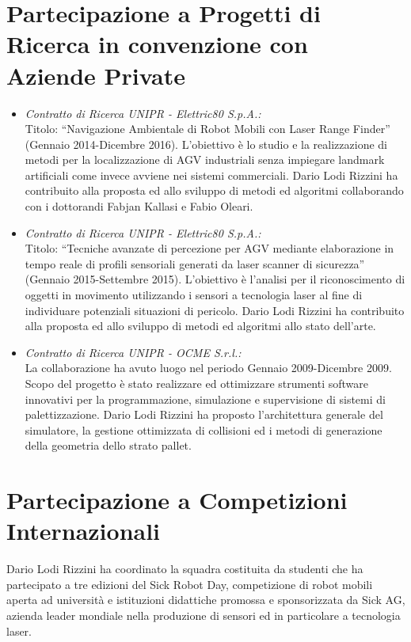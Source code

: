 \documentclass[11pt]{article}
\newcommand{\ITEMDATE}[1]{\item \textit{#1:}\\}
\begin{document}
\section*{Partecipazione a Progetti di Ricerca in convenzione con Aziende Private}

\begin{itemize}

\ITEMDATE{Contratto di Ricerca UNIPR - Elettric80 S.p.A.} 
Titolo: ``Navigazione Ambientale di Robot Mobili con Laser Range Finder'' (Gennaio 2014-Dicembre 2016). 
L'obiettivo \`e lo studio e la realizzazione di metodi per la localizzazione di AGV industriali 
senza impiegare landmark artificiali come invece avviene nei sistemi commerciali.
Dario Lodi Rizzini ha contribuito alla proposta ed allo sviluppo di metodi ed algoritmi 
collaborando con i dottorandi Fabjan Kallasi e Fabio Oleari.

\ITEMDATE{Contratto di Ricerca UNIPR - Elettric80 S.p.A.} 
Titolo: ``Tecniche avanzate di percezione per AGV mediante elaborazione in tempo reale di profili sensoriali generati da laser scanner di sicurezza'' (Gennaio 2015-Settembre 2015). 
L'obiettivo \`e l'analisi per il riconoscimento di oggetti in movimento utilizzando 
i sensori a tecnologia laser al fine di individuare potenziali situazioni di pericolo.
Dario Lodi Rizzini ha contribuito alla proposta ed allo sviluppo di metodi ed algoritmi 
allo stato dell'arte.

\ITEMDATE{Contratto di Ricerca UNIPR - OCME S.r.l.}
La collaborazione ha avuto luogo nel periodo Gennaio 2009-Dicembre 2009. 
Scopo del progetto \`e stato realizzare ed ottimizzare strumenti software innovativi per 
la programmazione, simulazione e supervisione di sistemi di palettizzazione.
Dario Lodi Rizzini ha proposto l'architettura generale del simulatore, la gestione 
ottimizzata di collisioni ed i metodi di generazione della geometria dello strato pallet.

\end{itemize}


\section*{Partecipazione a Competizioni Internazionali}

Dario Lodi Rizzini ha coordinato la squadra costituita da studenti che ha partecipato a tre edizioni del Sick Robot Day,
competizione di robot mobili aperta ad universit\`a e istituzioni didattiche promossa e sponsorizzata 
da Sick AG, azienda leader mondiale nella produzione di sensori ed in particolare a tecnologia laser. 
\end{document}
